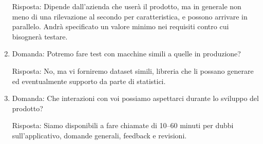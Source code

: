 \documentclass[12pt]{article}
\begin{document}
\begin{enumerate}
{        Risposta: Dipende dall'azienda che userà il prodotto, ma in generale non meno di una rilevazione al secondo per caratteristica, e possono arrivare in parallelo. Andrà specificato un valore minimo nei requisiti contro cui bisognerà testare.
    }
    \item {
        Domanda: Potremo fare test con macchine simili a quelle in produzione?
        
        Risposta: No, ma vi forniremo dataset simili, libreria che li possano generare ed eventualmente supporto da parte di statistici. 
    }
    \item {
        Domanda: Che interazioni con voi possiamo aspettarci durante lo sviluppo del prodotto?
        
        Risposta: Siamo disponibili a fare chiamate di 10--60 minuti per dubbi sull'applicativo, domande generali, feedback e revisioni.
    }
\end{enumerate}
\end{document}
